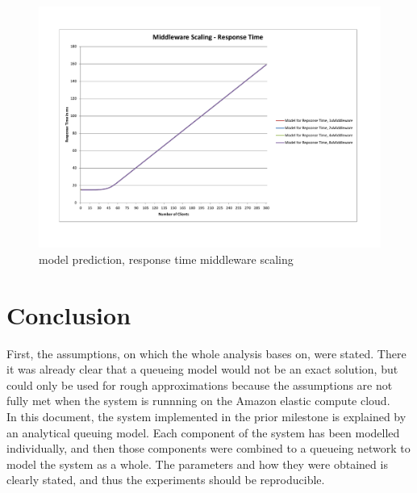 \documentclass[a4paper]{article}
\begin{document}
\begin{landscape}
\begin{figure}[H]
	\begin{center}
    \includegraphics[scale=0.7, trim = 23mm 28mm 24mm 25mm, clip]{measurements_increase_load/rt_middleware_scaling.pdf}
  \end{center}
  \caption{model prediction, response time middleware scaling}
  \label{fig:rt-middleware-scale}
\end{figure}

\end{landscape}



\pagebreak

\section{Conclusion}

First, the assumptions, on which the whole analysis bases on, were stated. There it was already clear that a queueing model would not be an exact solution, but could only be used for rough approximations because the assumptions are not fully met when the system is runnning on the Amazon elastic compute cloud.\\

In this document, the system implemented in the prior milestone\cite{milestone1} is explained by an analytical queuing model. Each component of the system has been modelled individually, and then those components were combined to a queueing network to model the system as a whole. The parameters and how they were obtained is clearly stated, and thus the experiments should be reproducible.\\
\end{document}
